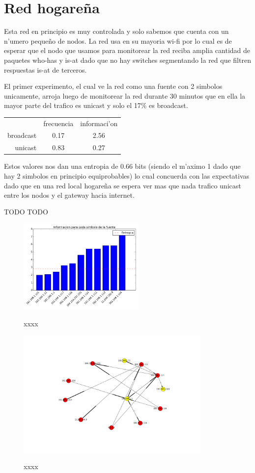 \section{Red hogare\~na}
Esta red en principio es muy controlada y solo sabemos que cuenta con un n'umero peque\~no de nodos. La red usa
en su mayoria wi-fi por lo cual es de esperar que el nodo que usamos para monitorear la red reciba amplia cantidad de
paquetes who-has y is-at dado que no hay switches segmentando la red que filtren respuestas is-at de terceros.

El primer experimento, el cual ve la red como una fuente con 2 simbolos unicamente, arroja luego de monitorear la red durante 30 minutos
que en ella  la mayor parte del trafico es unicast y solo el 17\% es broadcast.

\begin{tabular}{ r|c|c| }
\multicolumn{1}{r}{}
 &  \multicolumn{1}{c}{frecuencia}
 & \multicolumn{1}{c}{informaci'on} \\
\cline{2-3}
broadcast & 0.17 & 2.56 \\
\cline{2-3}
unicast & 0.83 & 0.27 \\
\cline{2-3}
\end{tabular}
 
 Estos valores nos dan una entropia de 0.66 bits (siendo el m'aximo 1 dado que hay 2 simbolos en principio equiprobables) lo
 cual concuerda con las expectativas dado que en una red local hogare\~na se espera ver mas que nada trafico unicast entre
 los nodos y el gateway hacia internet.
 
TODO TODO
 
\begin{figure}[!h]
\centering
\caption{xxxx}
\includegraphics[width=0.55\textwidth]{red1_info}
 \label{fig:xxxx}
\end{figure}



\begin{figure}[!h]
\centering
\caption{xxxx}
\includegraphics[width=0.85\textwidth]{red1_red}
 \label{fig:xxxx}
\end{figure}
